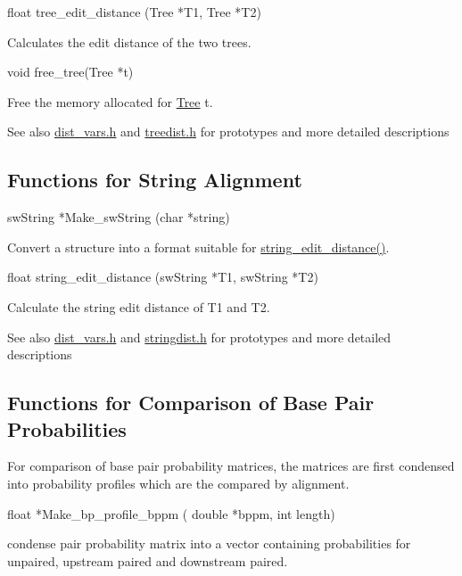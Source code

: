 \begin{DoxyVerb}float   tree_edit_distance (Tree *T1,
                            Tree *T2) 
\end{DoxyVerb}
 Calculates the edit distance of the two trees.

\begin{DoxyVerb}void    free_tree(Tree *t)
\end{DoxyVerb}
 Free the memory allocated for \mbox{\hyperlink{struct_tree}{Tree}} t.

\begin{DoxySeeAlso}{See also}
\mbox{\hyperlink{dist__vars_8h}{dist\+\_\+vars.\+h}} and \mbox{\hyperlink{treedist_8h}{treedist.\+h}} for prototypes and more detailed descriptions
\end{DoxySeeAlso}
\hypertarget{distance_measures_sec_string_alignment}{}\subsection{Functions for String Alignment}\label{distance_measures_sec_string_alignment}
\begin{DoxyVerb}swString *Make_swString (char *string)
\end{DoxyVerb}
 Convert a structure into a format suitable for \mbox{\hyperlink{stringdist_8h_a89e3c335ef17780576d7c0e713830db9}{string\+\_\+edit\+\_\+distance()}}.

\begin{DoxyVerb}float     string_edit_distance (swString *T1,
                                swString *T2)
\end{DoxyVerb}
 Calculate the string edit distance of T1 and T2.

\begin{DoxySeeAlso}{See also}
\mbox{\hyperlink{dist__vars_8h}{dist\+\_\+vars.\+h}} and \mbox{\hyperlink{stringdist_8h}{stringdist.\+h}} for prototypes and more detailed descriptions
\end{DoxySeeAlso}
\hypertarget{distance_measures_sec_compare_base_pair_probs}{}\subsection{Functions for Comparison of Base Pair Probabilities}\label{distance_measures_sec_compare_base_pair_probs}
For comparison of base pair probability matrices, the matrices are first condensed into probability profiles which are the compared by alignment.

\begin{DoxyVerb}float *Make_bp_profile_bppm ( double *bppm,
                              int length)
\end{DoxyVerb}
 condense pair probability matrix into a vector containing probabilities for unpaired, upstream paired and downstream paired.

